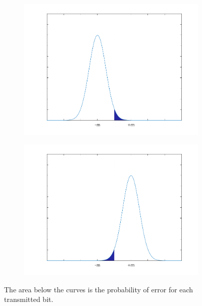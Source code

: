 \begin{figure}[H]
	\centering
	\begin{subfigure}{.5\textwidth}
		\centering
		\includegraphics[clip, trim=1cm 0cm 1cm 0cm,width=\textwidth]{./sdf/m_qam_system/figures/gaussian_error_2.pdf}
	\end{subfigure}%
	\begin{subfigure}{.5\textwidth}
		\centering
		\includegraphics[clip, trim=1cm 0cm 1cm 0cm,width=\textwidth]{./sdf/m_qam_system/figures/gaussian_error.pdf}
	\end{subfigure}
	\caption{The area below the curves is the probability of error for each transmitted bit.}
	\label{fig:gausserr}
\end{figure}

